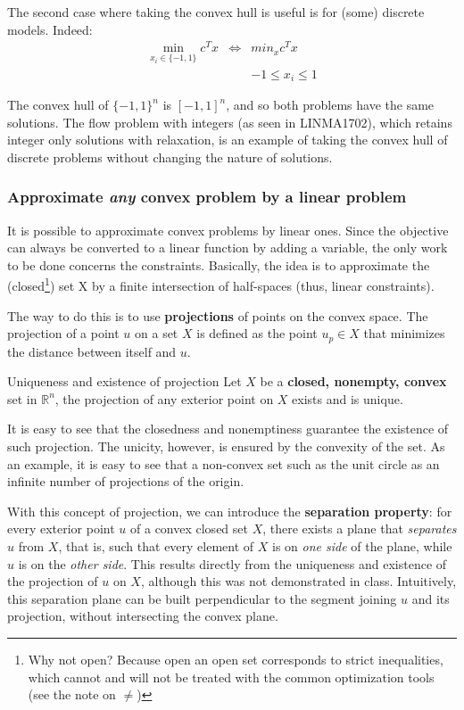 \documentclass[a4paper]{article}
\begin{document}
The second case where taking the convex hull is useful is for (some) discrete models. Indeed:
$$\begin{array}{ccl}
\min_{x_i \in \{-1,1\}} c^T x & \Longleftrightarrow & min_{x} c^T x  \\
 & & -1 \leq x_i \leq 1
\end{array}$$

The convex hull of $\{-1,1\}^n$ is $[-1,1]^n$, and so both problems have the same solutions. The flow problem with integers (as seen in LINMA1702), which retains integer only solutions with relaxation, is an example of taking the convex hull of discrete problems without changing the nature of solutions. 

\subsubsection{Approximate \textit{any} convex problem by a linear problem}


It is possible to approximate convex problems by linear ones. Since the objective can always be converted to a linear function by adding a variable, the only work to be done concerns the constraints. Basically, the idea is to approximate the (closed\footnote{Why not open? Because open an open set corresponds to strict inequalities, which cannot and will not be treated with the common optimization tools (see the note on $\neq$)}) set X by a finite intersection of half-spaces (thus, linear constraints).

The way to do this is to use \textbf{projections} of points on the convex space. The projection of a point $u$ on a set $X$ is defined as the point $u_p \in X$ that minimizes the distance between itself and $u$.

\begin{def2}{Uniqueness and existence of projection}
Let $X$ be a \textbf{closed, nonempty, convex} set in $\mathbb{R}^n$, the projection of any exterior point on $X$ exists and is unique.
\end{def2}

It is easy to see that the closedness and nonemptiness guarantee the existence of such projection. The unicity, however, is ensured by the convexity of the set. As an example, it is easy to see that a non-convex set such as the unit circle as an infinite number of projections of the origin.


With this concept of projection, we can introduce the \textbf{separation property}: for every exterior point $u$ of a convex closed set $X$, there exists a plane that \textit{separates} $u$ from $X$, that is, such that every element of $X$ is on \textit{one side} of the plane, while $u$ is on the \textit{other side}. This results directly from the uniqueness and existence of the projection of $u$ on $X$, although this was not demonstrated in class. Intuitively, this separation plane can be built perpendicular to the segment joining $u$ and its projection, without intersecting the convex plane.
\end{document}
